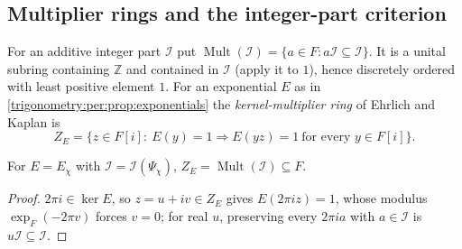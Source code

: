 \documentclass[11pt,letterpaper]{article}
\numberwithin{equation}{section}
\theoremstyle{definition}
\theoremstyle{remark}
\newcommand{\Z}{\mathbb Z}
\newcommand{\Mult}{\operatorname{Mult}}
\newcommand{\cI}{\mathcal I}
\begin{document}
\subsection{Multiplier rings and the integer-part criterion}\label{trigonometry:per:sec:multiplier}
For an additive integer part $\cI$ put $\Mult(\cI)=\{a\in F:a\cI\subseteq\cI\}$. It is a unital subring
containing $\Z$ and contained in $\cI$ (apply it to $1$), hence discretely ordered with least positive
element $1$. For an exponential $E$ as in \cref{trigonometry:per:prop:exponentials} the
\emph{kernel-multiplier ring} of Ehrlich and Kaplan is
\begin{equation}\label{trigonometry:per:eq:ZE}
 Z_E=\{z\in F[i]:\ E(y)=1\Rightarrow E(yz)=1\ \text{for every }y\in F[i]\}.
\end{equation}

\begin{proposition}\label{trigonometry:per:prop:ZE}
For $E=E_\chi$ with $\cI=\cI(\Psi_\chi)$, $Z_E=\Mult(\cI)\subseteq F$.
\end{proposition}
\begin{proof}
$2\pi i\in\ker E$, so $z=u+iv\in Z_E$ gives $E(2\pi iz)=1$, whose modulus $\exp_F(-2\pi v)$ forces
$v=0$; for real $u$, preserving every $2\pi ia$ with $a\in\cI$ is $u\cI\subseteq\cI$.
\end{proof}
\end{document}
